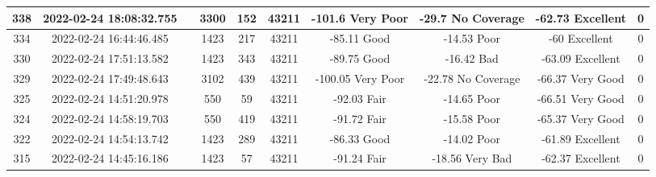 \begin{longtable*}{|c|c|c|c|c|c|c|c|c|c|}
338&2022-02-24 18:08:32.755&&3300&152&43211& -101.6    Very Poor   & -29.7     No Coverage & -62.73    Excellent   & 0\\\hline
{}334&2022-02-24 16:44:46.485&&1423&217&43211& -85.11    Good        & -14.53    Poor        & -60       Excellent   & 0\\\hline
{}330&2022-02-24 17:51:13.582&&1423&343&43211& -89.75    Good        & -16.42    Bad         & -63.09    Excellent   & 0\\\hline
{}329&2022-02-24 17:49:48.643&&3102&439&43211& -100.05   Very Poor   & -22.78    No Coverage & -66.37    Very Good   & 0\\\hline
{}325&2022-02-24 14:51:20.978&&550&59&43211& -92.03    Fair        & -14.65    Poor        & -66.51    Very Good   & 0\\\hline
{}324&2022-02-24 14:58:19.703&&550&419&43211& -91.72    Fair        & -15.58    Poor        & -65.37    Very Good   & 0\\\hline
{}322&2022-02-24 14:54:13.742&&1423&289&43211& -86.33    Good        & -14.02    Poor        & -61.89    Excellent   & 0\\\hline
{}315&2022-02-24 14:45:16.186&&1423&57&43211& -91.24    Fair        & -18.56    Very Bad    & -62.37    Excellent   & 0\\\hline

\end{longtable*}
